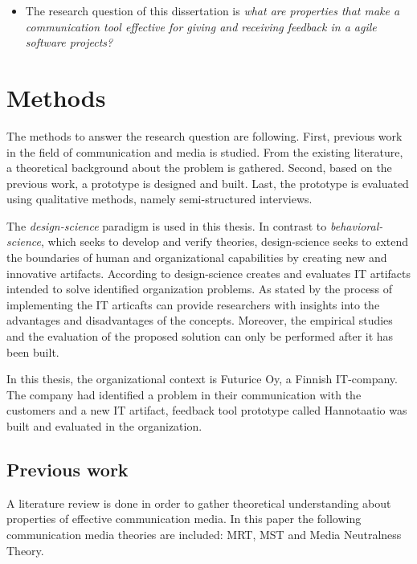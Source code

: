 \documentclass[english,12pt,a4paper,pdftex]{article}
\begin{document}
\begin{itemize}
\item The research question of this dissertation is \textit{what are properties that make a communication tool effective for giving and receiving feedback in a agile software projects?}
\end{itemize}

\clearpage

\section{Methods}

The methods to answer the research question are following. First, previous work in the field of communication and media is studied. From the existing literature, a theoretical background about the problem is gathered. Second, based on the previous work, a prototype is designed and built. Last, the prototype is evaluated using qualitative methods, namely semi-structured interviews.

The \emph{design-science} paradigm is used in this thesis. In contrast to \emph{behavioral-science}, which seeks to develop and verify theories, design-science seeks to extend the boundaries of human and organizational capabilities by creating new and innovative artifacts. According to \citet{hevner2004} design-science creates and evaluates IT artifacts intended to solve identified organization problems. As stated by \citep{nunamaker1990} the process of implementing the IT articafts can provide researchers with insights into the advantages and disadvantages of the concepts. Moreover, the empirical studies and the evaluation of the proposed solution can only be performed after it has been built.

In this thesis, the organizational context is Futurice Oy, a Finnish IT-company. The company had identified a problem in their communication with the customers and a new IT artifact, feedback tool prototype called Hannotaatio was built and evaluated in the organization.

\subsection{Previous work}

A literature review is done in order to gather theoretical understanding about properties of effective communication media. In this paper the following communication media theories are included: \ac{MRT}, \ac{MST} and Media Neutralness Theory. 
\end{document}

